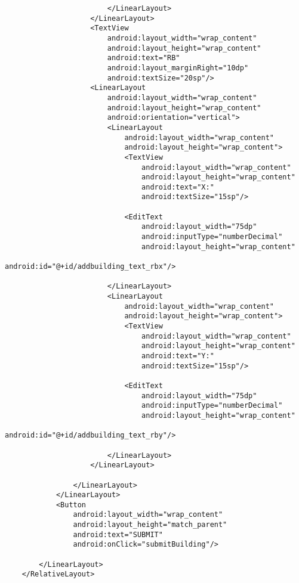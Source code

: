 \begin{lstlisting}
                        </LinearLayout>
                    </LinearLayout>
                    <TextView
                        android:layout_width="wrap_content"
                        android:layout_height="wrap_content"
                        android:text="RB"
                        android:layout_marginRight="10dp"
                        android:textSize="20sp"/>
                    <LinearLayout
                        android:layout_width="wrap_content"
                        android:layout_height="wrap_content"
                        android:orientation="vertical">
                        <LinearLayout
                            android:layout_width="wrap_content"
                            android:layout_height="wrap_content">
                            <TextView
                                android:layout_width="wrap_content"
                                android:layout_height="wrap_content"
                                android:text="X:"
                                android:textSize="15sp"/>

                            <EditText
                                android:layout_width="75dp"
                                android:inputType="numberDecimal"
                                android:layout_height="wrap_content"
                                android:id="@+id/addbuilding_text_rbx"/>

                        </LinearLayout>
                        <LinearLayout
                            android:layout_width="wrap_content"
                            android:layout_height="wrap_content">
                            <TextView
                                android:layout_width="wrap_content"
                                android:layout_height="wrap_content"
                                android:text="Y:"
                                android:textSize="15sp"/>

                            <EditText
                                android:layout_width="75dp"
                                android:inputType="numberDecimal"
                                android:layout_height="wrap_content"
                                android:id="@+id/addbuilding_text_rby"/>

                        </LinearLayout>
                    </LinearLayout>

                </LinearLayout>
            </LinearLayout>
            <Button
                android:layout_width="wrap_content"
                android:layout_height="match_parent"
                android:text="SUBMIT"
                android:onClick="submitBuilding"/>

        </LinearLayout>
    </RelativeLayout>
\end{lstlisting}
\newpage
